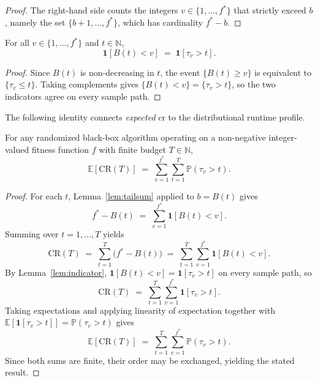 \begin{proof}
  The right-hand side counts the integers $v \in \{1,\ldots,f^*\}$
  that strictly exceed
  $b$, namely the set $\{b+1,\ldots,f^*\}$, which has cardinality $f^* - b$.
\end{proof}

\begin{lemma}
  \label{lem:indicator}
  For all $v \in \{1, \ldots, f^*\}$ and $t \in \mathbb{N}$,
  \[
    \mathbf{1}[B(t) < v] \;=\; \mathbf{1}[\tau_v > t].
  \]
\end{lemma}

\begin{proof}
  Since $B(t)$ is non-decreasing in $t$, the event $\{B(t) \ge v\}$
  is equivalent to
  $\{\tau_v \le t\}$. Taking complements gives $\{B(t) < v\} =
  \{\tau_v > t\}$, so the
  two indicators agree on every sample path.
\end{proof}

The following identity connects \textit{expected} \acrshort{cr}
to the distributional
runtime profile.

\begin{theorem}
  \label{thm:regret-profile}
  For any randomized black-box algorithm operating on a non-negative
  integer-valued fitness function $f$ with finite budget $T \in \mathbb{N}$,
  \[
    \mathbb{E}[\mathrm{CR}(T)]
    \;=\;
    \sum_{v=1}^{f^*} \sum_{t=1}^{T} \mathbb{P}(\tau_v > t).
  \]
\end{theorem}

\begin{proof}
  For each $t$, Lemma~\ref{lem:tailsum} applied to $b = B(t)$ gives
  \[
    f^* - B(t) \;=\; \sum_{v=1}^{f^*} \mathbf{1}[B(t) < v].
  \]
  Summing over $t = 1, \ldots, T$ yields
  \[
    \mathrm{CR}(T)
    \;=\; \sum_{t=1}^{T}\bigl(f^* - B(t)\bigr)
    \;=\; \sum_{t=1}^{T} \sum_{v=1}^{f^*} \mathbf{1}[B(t) < v].
  \]
  By Lemma~\ref{lem:indicator}, $\mathbf{1}[B(t) < v] =
  \mathbf{1}[\tau_v > t]$ on every
  sample path, so
  \[
    \mathrm{CR}(T) \;=\; \sum_{t=1}^{T} \sum_{v=1}^{f^*} \mathbf{1}[\tau_v > t].
  \]
  Taking expectations and applying linearity of expectation together with
  $\mathbb{E}[\mathbf{1}[\tau_v > t]] = \mathbb{P}(\tau_v > t)$ gives
  \[
    \mathbb{E}[\mathrm{CR}(T)]
    \;=\; \sum_{t=1}^{T} \sum_{v=1}^{f^*} \mathbb{P}(\tau_v > t).
  \]
  Since both sums are finite, their order may be exchanged, yielding
  the stated result.
\end{proof}

